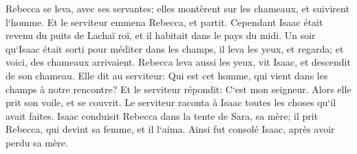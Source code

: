 \verse Rebecca se leva, avec ses servantes; elles montèrent sur les chameaux, et suivirent l`homme. Et le serviteur emmena Rebecca, et partit. 
\verse Cependant Isaac était revenu du puits de Lachaï roï, et il habitait dans le pays du midi. 
\verse Un soir qu`Isaac était sorti pour méditer dans les champs, il leva les yeux, et regarda; et voici, des chameaux arrivaient. 
\verse Rebecca leva aussi les yeux, vit Isaac, et descendit de son chameau. 
\verse Elle dit au serviteur: Qui est cet homme, qui vient dans les champs à notre rencontre? Et le serviteur répondit: C`est mon seigneur. Alors elle prit son voile, et se couvrit. 
\verse Le serviteur raconta à Isaac toutes les choses qu`il avait faites. 
\verse Isaac conduisit Rebecca dans la tente de Sara, sa mère; il prit Rebecca, qui devint sa femme, et il l`aima. Ainsi fut consolé Isaac, après avoir perdu sa mère. 

\chapter{}

